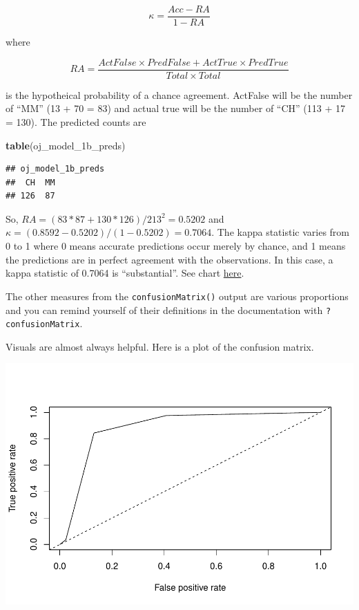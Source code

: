 \documentclass[
]{book}
\newenvironment{Shaded}{\begin{snugshade}}{\end{snugshade}}
\newcommand{\DataTypeTok}[1]{\textcolor[rgb]{0.13,0.29,0.53}{#1}}
\newcommand{\KeywordTok}[1]{\textcolor[rgb]{0.13,0.29,0.53}{\textbf{#1}}}
\newcommand{\NormalTok}[1]{#1}
\newcommand{\OperatorTok}[1]{\textcolor[rgb]{0.81,0.36,0.00}{\textbf{#1}}}
\newcommand{\StringTok}[1]{\textcolor[rgb]{0.31,0.60,0.02}{#1}}
\begin{document}
\[\kappa = \frac{Acc - RA}{1-RA}\]

where

\[RA = \frac{ActFalse \times PredFalse + ActTrue \times PredTrue}{Total \times Total}\]

is the hypotheical probability of a chance agreement. ActFalse will be the number of ``MM'' (13 + 70 = 83) and actual true will be the number of ``CH'' (113 + 17 = 130). The predicted counts are

\begin{Shaded}
\begin{Highlighting}[]
\KeywordTok{table}\NormalTok{(oj_model_1b_preds)}
\end{Highlighting}
\end{Shaded}

\begin{verbatim}
## oj_model_1b_preds
##  CH  MM 
## 126  87
\end{verbatim}

So, \(RA = (83*87 + 130*126) / 213^2 = 0.5202\) and \(\kappa = (0.8592 - 0.5202)/(1 - 0.5202) = 0.7064\). The kappa statistic varies from 0 to 1 where 0 means accurate predictions occur merely by chance, and 1 means the predictions are in perfect agreement with the observations. In this case, a kappa statistic of 0.7064 is ``substantial''. See chart \href{https://www.statisticshowto.datasciencecentral.com/cohens-kappa-statistic/}{here}.

The other measures from the \texttt{confusionMatrix()} output are various proportions and you can remind yourself of their definitions in the documentation with \texttt{?confusionMatrix}.

Visuals are almost always helpful. Here is a plot of the confusion matrix.

\begin{Shaded}
\end{Shaded}

\includegraphics{data-sci_files/figure-latex/unnamed-chunk-45-1.pdf}
\end{document}

